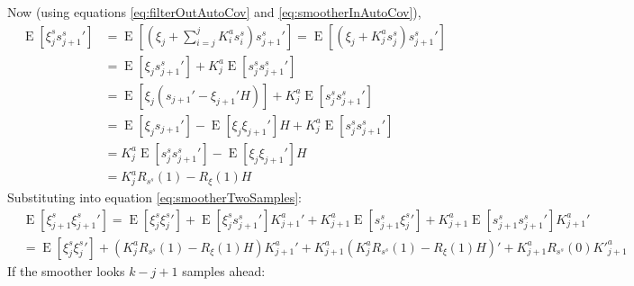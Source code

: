 \documentclass[oneside,12pt]{article}
\begin{document}
%
Now (using equations \ref{eq:filterOutAutoCov} and \ref{eq:smootherInAutoCov}),
%
\begin{equation}
    \begin{split}
        \operatorname{E}[\xi^s_j s^s_{j+1}' ] &= \operatorname{E}[(\xi_j + \sum_{i=j}^{j} K^a_{i} s^s_{i}) s^s_{j+1}' ] = \operatorname{E}[(\xi_j + K^a_{j} s^s_{j}) s^s_{j+1}' ]\\
        &= \operatorname{E}[\xi_j s^s_{j+1}'] +  K^a_{j} \operatorname{E}[ s^s_{j} s^s_{j+1}']\\
        &= \operatorname{E}[\xi_j (s_{j+1}' - \xi_{j+1}'H)] +  K^a_{j} \operatorname{E}[ s^s_{j} s^s_{j+1}']\\
        &= \operatorname{E}[\xi_j s_{j+1}']
        - \operatorname{E}[\xi_j \xi_{j+1}'] H
        +  K^a_{j} \operatorname{E}[ s^s_{j} s^s_{j+1}']\\
        &= K^a_{j} \operatorname{E}[ s^s_{j} s^s_{j+1}']
        - \operatorname{E}[\xi_j \xi_{j+1}'] H\\
        &= K^a_{j} R_{s^s}(1) - R_{\xi}(1) H
    \end{split}
\end{equation}
%
Substituting into equation \ref{eq:smootherTwoSamples}:
%
\begin{equation}
    \begin{split}
        &\operatorname{E}[\xi^s_{j+1}\xi^s_{j+1}'] = \operatorname{E}[\xi^s_j \xi^s_j'] 
        + \operatorname{E}[\xi^s_j s^s_{j+1}' ] K^a_{j+1}' 
        + K^a_{j+1} \operatorname{E}[ s^s_{j+1} \xi^s_j']
        + K^a_{j+1} \operatorname{E}[ s^s_{j+1} s^s_{j+1}' ] K^a_{j+1}'\\
        &= \operatorname{E}[\xi^s_j \xi^s_j']
        + (K^a_{j} R_{s^s}(1) - R_{\xi}(1) H) K^a_{j+1}'
        + K^a_{j+1} (K^a_{j} R_{s^s}(1) - R_{\xi}(1) H)' + K^a_{j+1}R_{s^s}(0) K'^a_{j+1}
    \end{split}
\end{equation}
%
If the smoother looks $k-j+1$ samples ahead:
%
\end{document}
